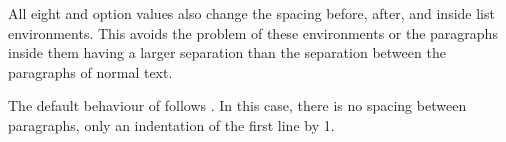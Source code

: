 All eight  and  option values
also change the spacing before, after, and inside list environments. This
avoids the problem of these environments or the paragraphs inside them having
a larger separation than the separation between the paragraphs of normal text.
%

The default behaviour of {\KOMAScript} follows
. In this case, there is no spacing between
paragraphs, only an indentation of the first line by 1.%
%
%
%
\fi %


